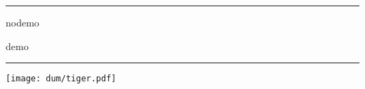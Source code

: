 \documentclass[a4paper]{article}
\begin{document}
\hrule
\begin{description}
  \Large
  \item[graphicx:] nodemo
  \item[pdfpages:] demo
\end{description}
\hrule

\tableofcontents
\texttt{[image: dum/tiger.pdf]}


\end{document}
